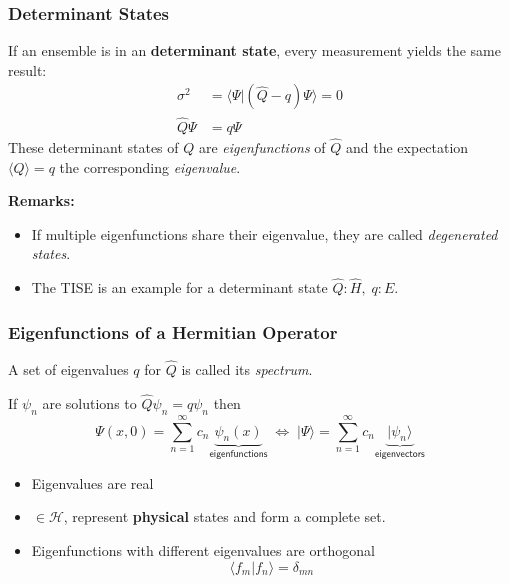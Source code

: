 \subsubsection{Determinant States}\label{midterm:det_states}
If an ensemble is in an \textbf{determinant state}, every measurement yields the same result:
\noindent\begin{align*}
    \sigma^2     & = \langle \Psi|(\hat{Q} - q) \Psi\rangle = 0 \\
    \hat{Q} \Psi & = q \Psi
\end{align*}
These determinant states of $Q$ are \textit{eigenfunctions} of $\hat{Q}$ and the expectation $\langle Q\rangle = q$ the corresponding \textit{eigenvalue}.

\textbf{Remarks:}
\begin{itemize}
    \item If multiple eigenfunctions share their eigenvalue, they are called \textit{degenerated states}.
    \item The TISE is an example for a determinant state\newline
          $\hat{Q}: \hat{H},\; q:E$.
\end{itemize}

\subsubsection{Eigenfunctions of a Hermitian Operator}\label{midterm:eig_fun}
A set of eigenvalues $q$ for $\hat{Q}$ is called its \textit{spectrum}.

\newpar{}

If $\psi_n$ are solutions to $\hat{Q}\psi_n=q\psi_n$ then
\noindent\begin{equation*}
    \Psi(x,0)     = \sum_{n=1}^{\infty} c_n \underbrace{\psi_n(x)}_{\textsf{eigenfunctions}} \;\Leftrightarrow\; |\Psi\rangle  = \sum_{n=1}^{\infty} c_n \underbrace{|\psi_n\rangle}_{\textsf{eigenvectors}}
\end{equation*}

\begin{itemize}
    \item Eigenvalues are real
    \item $\in \mathcal{H}$, represent \textbf{physical} states and form a complete set.
    \item Eigenfunctions with different eigenvalues are orthogonal
          \noindent\begin{equation*}
              \langle f_m|f_n\rangle=\delta_{mn}
          \end{equation*}
\end{itemize}


